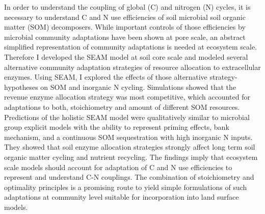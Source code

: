 In order to understand the coupling of global (C) and nitrogen (N) cycles, it is
necessary to understand C and N use efficiencies of soil microbial soil organic
matter (SOM) decomposers. While important controls of those efficiencies by
microbial community adaptations have been shown at pore scale, an abstract
simplified representation of community adaptations is needed at ecosystem scale.
Therefore I developed the SEAM model at soil core scale and modeled several
alternative community adaptation strategies of resource allocation to
extracellular enzymes. Using SEAM, I explored the effects of those alternative
strategy-hypotheses on SOM and inorganic N cycling. Simulations showed that the
revenue enzyme allocation strategy was most competitive, which accounted for
adaptations to both, stoichiometry and amount of different SOM resources.
Predictions of the holistic SEAM model were qualitatively similar to microbial
group explicit models with the ability to represent priming effects, bank
mechanism, and a continuous SOM sequestration with high inorganic N inputs. They
showed that soil enzyme allocation strategies strongly affect long term soil
organic matter cycling and nutrient recycling.
The findings imply that ecosystem scale models should account for adaptation of
C and N use efficiencies to represent and understand C-N couplings. The
combination of stoichiometry and optimality principles is a promising route to
yield simple formulations of such adaptations at community level suitable for
incorporation into land surface models.
